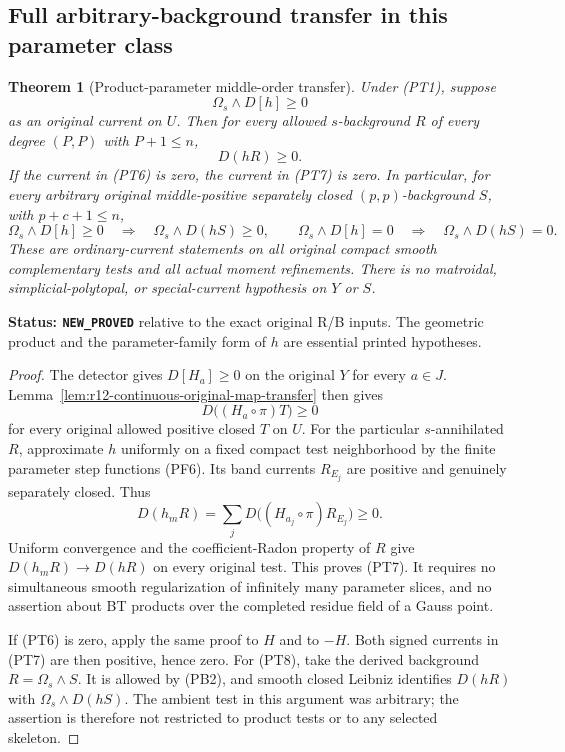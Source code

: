 \documentclass[11pt,a4paper]{article}
\numberwithin{equation}{section}
\newtheorem{theorem}{Theorem}[section]
\theoremstyle{definition}
\theoremstyle{remark}
\begin{document}
\subsection{Full arbitrary-background transfer in this parameter class}

\begin{theorem}[Product-parameter middle-order transfer]
\label{thm:r12-product-parameter-order-transfer}
Under (PT1), suppose
\[
                           \Omega_s\wedge D[h]\ge0
 \tag{PT6}
\]
as an original current on $U$. Then for every allowed $s$-background
$R$ of every degree $(P,P)$ with $P+1\le n$,
\[
                                    D(hR)\ge0.
 \tag{PT7}
\]
If the current in (PT6) is zero, the current in (PT7) is zero.
In particular, for every arbitrary original middle-positive
separately closed $(p,p)$-background $S$, with $p+c+1\le n$,
\[
 \Omega_s\wedge D[h]\ge0
      \quad\Longrightarrow\quad \Omega_s\wedge D(hS)\ge0,
 \qquad
 \Omega_s\wedge D[h]=0
      \quad\Longrightarrow\quad \Omega_s\wedge D(hS)=0.
 \tag{PT8}
\]
These are ordinary-current statements on all original compact
smooth complementary tests and all actual moment refinements.
There is no matroidal, simplicial-polytopal, or special-current
hypothesis on $Y$ or $S$.
\end{theorem}

\noindent\textbf{Status: \texttt{NEW\_PROVED}} relative to the
exact original R/B inputs. The geometric product and the
parameter-family form of $h$ are essential printed hypotheses.

\begin{proof}
The detector gives $D[H_a]\ge0$ on the original $Y$ for every
$a\in J$. Lemma~\ref{lem:r12-continuous-original-map-transfer}
then gives
\[
             D\bigl((H_a\circ\pi)T\bigr)\ge0
\]
for every original allowed positive closed $T$ on $U$.
For the particular $s$-annihilated $R$, approximate $h$ uniformly
on a fixed compact test neighborhood by the finite parameter
step functions (PF6). Its band currents $R_{E_j}$ are positive
and genuinely separately closed. Thus
\[
                    D(h_mR)=\sum_j
                            D\bigl((H_{a_j}\circ\pi)R_{E_j}\bigr)
                                      \ge0.
 \tag{PT9}
\]
Uniform convergence and the coefficient-Radon property of $R$
give $D(h_mR)\to D(hR)$ on every original test. This proves (PT7).
It requires no simultaneous smooth regularization of infinitely
many parameter slices, and no assertion about BT products over
the completed residue field of a Gauss point.

If (PT6) is zero, apply the same proof to $H$ and to $-H$.
Both signed currents in (PT7) are then positive, hence zero.
For (PT8), take the derived background $R=\Omega_s\wedge S$.
It is allowed by (PB2), and smooth closed Leibniz identifies
$D(hR)$ with $\Omega_s\wedge D(hS)$. The ambient test in this
argument was arbitrary; the assertion is therefore not restricted
to product tests or to any selected skeleton.
\end{proof}
\end{document}
